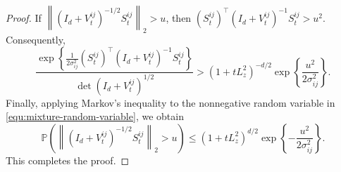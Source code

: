 \documentclass[12pt]{article}
\begin{document}
\begin{proof}
If $\left\| \left( I_d+V_t^{ij} \right)^{-1/2} S_t^{ij} \right\|_2 > u$, then $(S_t^{ij})^\top \left( I_d+V_t^{ij} \right)^{-1} S_t^{ij} > u^2$.
Consequently,
\begin{equation*}
\frac{
\exp\left\{
\frac{1}{2\sigma_{ij}^2}
(S_t^{ij})^\top
\left(
I_d+V_t^{ij}
\right)^{-1}
S_t^{ij}
\right\}
}{
\det\left(
I_d+V_t^{ij}
\right)^{1/2}
} >
\left(
1+tL_z^2
\right)^{-d/2}
\exp\left\{
\frac{u^2}{2\sigma_{ij}^2}
\right\}.    
\end{equation*}
Finally, applying Markov's inequality to the nonnegative random variable in
\eqref{equ:mixture-random-variable}, we obtain
\[
\mathbb P\left(
\left\|
\left(
I_d+V_t^{ij}
\right)^{-1/2}
S_t^{ij}
\right\|_2
>
u
\right)
\le
\left(
1+tL_z^2
\right)^{d/2}
\exp\left\{
-\frac{u^2}{2\sigma_{ij}^2}
\right\}.
\]
This completes the proof.
\end{proof}
\end{document}
